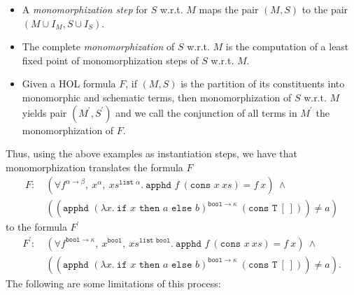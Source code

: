 \documentclass{article}
\begin{document}
		\begin{itemize}
		\item A \textit{monomorphization 
			step} for $S$ w.r.t. $M$ maps 
			the pair $(M,S)$ to the pair 
			$(M \cup I_M, S \cup I_S)$.
		\item The complete 
			\textit{monomorphization} of $S$ 
			w.r.t. $M$ is the computation of 
			a least fixed point of 
			monomorphization steps of $S$ 
			w.r.t. $M$.
		\item Given a HOL formula $F$, 
			if $(M, S)$ is the partition of its 
			constituents into monomorphic and 
			schematic terms, then 
			monomorphization of $S$ 
			w.r.t. $M$ yields pair 
			$(M^{\prime}, S^{\prime})$ and we 
			call the conjunction of all terms in 
			$M^{\prime}$ the monomorphization 
			of $F$.
		\end{itemize}
		Thus, using the above examples as 
		instantiation steps, we have that 
		monomorphization translates the formula $F$
		\begin{align*}
			F:\ &(\forall f^{\alpha \to \beta},\ 
			x^{\alpha},\ xs^{\texttt{list }\alpha}.\ 
			\texttt{apphd }f\ (\texttt{cons }x
			\ xs) = f\ x)\ \land\ \\
			&((\texttt{apphd }(\lambda x.\ 
			\texttt{if }x \texttt{ then }a 
			\texttt{ else } b)^{\texttt{bool} 
			\to \kappa}\ (\texttt{cons T}\ [\ ])) 
			\neq a)
		\end{align*}
		to the formula $F^{\prime}$
		\begin{align*}
			F^{\prime}:\ &(\forall 
			f^{\texttt{bool} \to \kappa},\ 
			x^{\texttt{bool}},\ 
			xs^{\texttt{list bool}}.\ 
			\texttt{apphd }f\ (\texttt{cons }x
			\ xs) = f\ x) \ \land\ \\
			&((\texttt{apphd } (\lambda x.\ 
			\texttt{if }x \texttt{ then }a 
			\texttt{ else } b)^{\texttt{bool} 
			\to \kappa}\ (\texttt{cons T}\ 
			[\ ])) \neq a).
		\end{align*}
		\noindent The following are some 
		limitations of this process:
\end{document}

